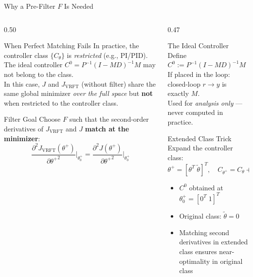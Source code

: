 \documentclass[aspectratio=169]{beamer}
\newcommand{\JJ}{J_{\mathrm{VRFT}}}
\newcommand{\Jopt}{J}
\begin{document}
\begin{frame}{Why a Pre-Filter $F$ Is Needed}
  \begin{columns}[T]
    \begin{column}{0.50\textwidth}
      \begin{alertblock}{When Perfect Matching Fails}
        In practice, the controller class $\{C_\theta\}$ is \emph{restricted} (e.g., PI/PID). The ideal controller $C^0 = P^{-1}(I-MD)^{-1}M$ may not belong to the class.\\[0.4em]
        In this case, $\Jopt$ and $\JJ$ (without filter) share the same global minimizer \emph{over the full space} but \textbf{not} when restricted to the controller class.
      \end{alertblock}
      \vspace{0.3em}
      \begin{block}{Filter Goal}
        Choose $F$ such that the second-order derivatives of $\JJ$ and $\Jopt$ \textbf{match at the minimizer}:
        \[
          \frac{\partial^2 \JJ(\theta^+)}{\partial{\theta^+}^2}\Bigg|_{\theta^+_0}
          = \frac{\partial^2 \Jopt(\theta^+)}{\partial{\theta^+}^2}\Bigg|_{\theta^+_0}
        \]
      \end{block}
    \end{column}
    \begin{column}{0.47\textwidth}
      \begin{block}{The Ideal Controller}
        Define $C^0 := P^{-1}(I-MD)^{-1}M$\\[0.3em]
        If placed in the loop: closed-loop $r \to y$ is exactly $M$.\\[0.3em]
        Used for \emph{analysis only} --- never computed in practice.
      \end{block}
      \vspace{0.3em}
      \begin{exampleblock}{Extended Class Trick}
        Expand the controller class:
        \[ \theta^+ = [\theta^T\;\tilde\theta]^T, \quad C_{\theta^+} = C_\theta + \tilde\theta(C^0 - C_0) \]
        \begin{itemize}
          \item $C^0$ obtained at $\theta^+_0 = [0^T\;1]^T$
          \item Original class: $\tilde\theta = 0$
          \item Matching second derivatives in extended class ensures near-optimality in original class
        \end{itemize}
      \end{exampleblock}
    \end{column}
  \end{columns}
\end{frame}
\end{document}
